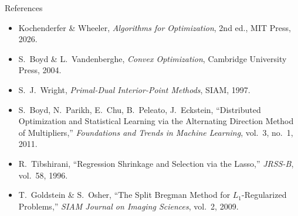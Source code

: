 \documentclass[aspectratio=169,10pt]{beamer}
\begin{document}
\begin{frame}{References}
  \begin{itemize}
    \item Kochenderfer \& Wheeler, \textit{Algorithms for Optimization},
          2nd ed., MIT Press, 2026.
    \item S.\ Boyd \& L.\ Vandenberghe, \textit{Convex Optimization},
          Cambridge University Press, 2004.
    \item S.\ J.\ Wright, \textit{Primal-Dual Interior-Point Methods},
          SIAM, 1997.
    \item S.\ Boyd, N.\ Parikh, E.\ Chu, B.\ Peleato, J.\ Eckstein,
          ``Distributed Optimization and Statistical Learning via the
          Alternating Direction Method of Multipliers,''
          \textit{Foundations and Trends in Machine Learning},
          vol.\ 3, no.\ 1, 2011.
    \item R.\ Tibshirani, ``Regression Shrinkage and Selection via the
          Lasso,'' \textit{JRSS-B}, vol.\ 58, 1996.
    \item T.\ Goldstein \& S.\ Osher, ``The Split Bregman Method for
          $L_1$-Regularized Problems,'' \textit{SIAM Journal on Imaging
          Sciences}, vol.\ 2, 2009.
  \end{itemize}
\end{frame}
\end{document}
